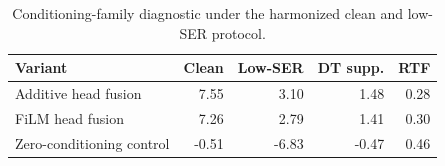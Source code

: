 \begin{table}[!t]
\caption{Conditioning-family diagnostic under the harmonized clean and low-SER protocol.}
\label{tab:ablation-main}
\centering
\scriptsize
\begin{tabular}{lrrrr}
\hline
Variant & Clean & Low-SER & DT supp. & RTF \\
\hline
Additive head fusion & 7.55 & 3.10 & 1.48 & 0.28 \\
FiLM head fusion & 7.26 & 2.79 & 1.41 & 0.30 \\
Zero-conditioning control & -0.51 & -6.83 & -0.47 & 0.46 \\
\hline
\end{tabular}
\end{table}
